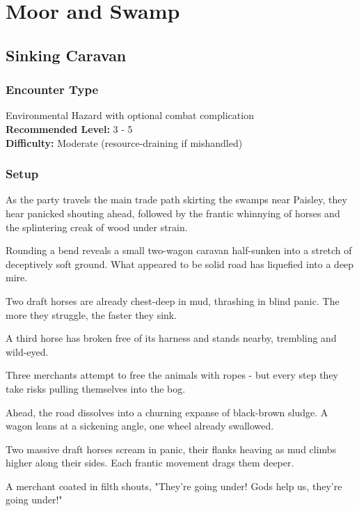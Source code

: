 \chapter*{Moor and Swamp}
\section*{Sinking Caravan}
\subsection*{Encounter Type}
{\entryfont Environmental Hazard with optional combat complication\\
\textbf{Recommended Level:} 3 - 5\\
\textbf{Difficulty:} Moderate (resource-draining if mishandled)}
\subsection*{Setup}
{\entryfont As the party travels the main trade path skirting the swamps near Paisley, they hear panicked shouting ahead, followed by the frantic whinnying of horses and the splintering creak of wood under strain.

Rounding a bend reveals a small two-wagon caravan half-sunken into a stretch of deceptively soft ground. What appeared to be solid road has liquefied into a deep mire.

Two draft horses are already chest-deep in mud, thrashing in blind panic. The more they struggle, the faster they sink.

A third horse has broken free of its harness and stands nearby, trembling and wild-eyed.

Three merchants attempt to free the animals with ropes - but every step they take risks pulling themselves into the bog.}
\begin{DndReadAloud}
	Ahead, the road dissolves into a churning expanse of black-brown sludge. A wagon leans at a sickening angle, one wheel already swallowed.

	Two massive draft horses scream in panic, their flanks heaving as mud climbs higher along their sides. Each frantic movement drags them deeper.

	A merchant coated in filth shouts, "They're going under! Gods help us, they're going under!"
\end{DndReadAloud}

